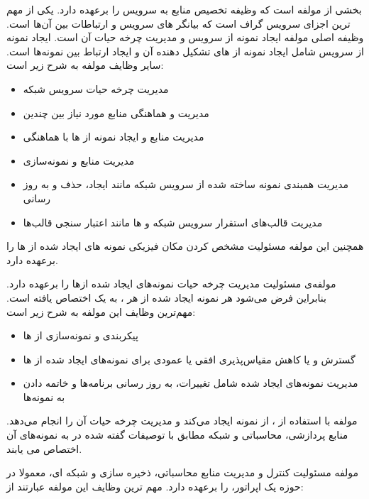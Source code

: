  بخشی از مولفه  است که وظیفه تخصیص منابع به سرویس را برعهده دارد.
یکی از مهم ترین اجزای سرویس گراف  است که بیانگر  های سرویس و ارتباطات بین آن‌ها است.
وظیفه اصلی مولفه  ایجاد نمونه از سرویس و مدیریت چرخه حیات آن است.
ایجاد نمونه از سرویس شامل ایجاد نمونه از ‌های تشکیل دهنده آن و ایجاد ارتباط بین نمونه‌ها است.
سایر وظایف مولفه  به شرح زیر است:
\begin{itemize}
    \item مدیریت چرخه حیات سرویس شبکه
    \item مدیریت و هماهنگی منابع مورد نیاز  بین چندین 
    \item مدیریت منابع و ایجاد نمونه از ‌ها با هماهنگی 
    \item مدیریت منابع و نمونه‌سازی 
    \item مدیریت همبندی نمونه ساخته شده از سرویس شبکه مانند ایجاد، حذف و به روز رسانی 
    \item مدیریت قالب‌های استقرار سرویس شبکه و ها مانند اعتبار سنجی قالب‌ها
\end{itemize}
همچنین این مولفه مسئولیت مشخص کردن مکان فیزیکی نمونه های ایجاد شده از ها را برعهده دارد.

مولفه‌ی  مسئولیت مدیریت چرخه حیات نمونه‌های ایجاد شده از‌ها را برعهده دارد.
بنابراین فرض می‌شود هر نمونه ایجاد شده از هر ، به یک  اختصاص یافته است.
مهم‌ترین وظایف این مولفه به شرح زیر است:
\begin{itemize}
    \item پیکربندی و نمونه‌سازی از ‌ها
    \item گسترش و یا کاهش مقیاس‌پذیری افقی یا عمودی برای نمونه‌های ایجاد شده از ها
    \item مدیریت نمونه‌های ایجاد شده شامل  تغییرات، به روز رسانی برنامه‌ها و خاتمه دادن به نمونه‌ها
\end{itemize}
مولفه  با استفاده از ، از  نمونه ایجاد می‌کند و
مدیریت چرخه حیات آن را انجام می‌دهد.
منابع پردازشی، محاسباتی و شبکه مطابق با توصیفات گفته شده در  به نمونه‌های آن اختصاص می یابند.

مولفه  مسئولیت کنترل و مدیریت منابع محاسباتی، ذخیره سازی و شبکه ای،
معمولا در حوزه یک اپراتور، را برعهده دارد.
مهم ترین وظایف این مولفه عبارتند از:

